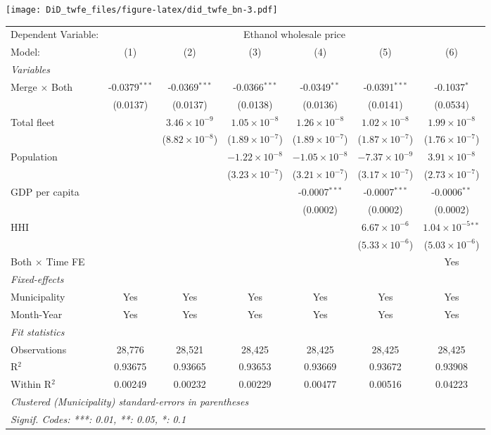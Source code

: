 \documentclass[
]{article}
\begin{document}
\texttt{[image: DiD\_twfe\_files/figure-latex/did\_twfe\_bn-3.pdf]}

\begin{tabular}{lcccccc}
\tabularnewline\midrule\midrule
Dependent Variable:&\multicolumn{6}{c}{Ethanol wholesale price}\\
Model:&(1) & (2) & (3) & (4) & (5) & (6)\\
\midrule \emph{Variables}&   &   &   &   &   &  \\
Merge $\times $ Both & -0.0379$^{***}$ & -0.0369$^{***}$ & -0.0366$^{***}$ & -0.0349$^{**}$ & -0.0391$^{***}$ & -0.1037$^{*}$\\
  &(0.0137) & (0.0137) & (0.0138) & (0.0136) & (0.0141) & (0.0534)\\
Total fleet &    & $3.46\times 10^{-9}$ & $1.05\times 10^{-8}$ & $1.26\times 10^{-8}$ & $1.02\times 10^{-8}$ & $1.99\times 10^{-8}$\\
  &   & ($8.82\times 10^{-8}$) & ($1.89\times 10^{-7}$) & ($1.89\times 10^{-7}$) & ($1.87\times 10^{-7}$) & ($1.76\times 10^{-7}$)\\
Population &    &    & $-1.22\times 10^{-8}$ & $-1.05\times 10^{-8}$ & $-7.37\times 10^{-9}$ & $3.91\times 10^{-8}$\\
  &   &    & ($3.23\times 10^{-7}$) & ($3.21\times 10^{-7}$) & ($3.17\times 10^{-7}$) & ($2.73\times 10^{-7}$)\\
GDP per capita &    &    &    & -0.0007$^{***}$ & -0.0007$^{***}$ & -0.0006$^{**}$\\
  &   &    &    & (0.0002) & (0.0002) & (0.0002)\\
HHI &    &    &    &    & $6.67\times 10^{-6}$ & $1.04\times 10^{-5}$$^{**}$\\
  &   &    &    &    & ($5.33\times 10^{-6}$) & ($5.03\times 10^{-6}$)\\
Both $\times$ Time FE &  &  &  &  &  & Yes\\
\midrule \emph{Fixed-effects}&   &   &   &   &   &  \\
Municipality & Yes & Yes & Yes & Yes & Yes & Yes\\
Month-Year & Yes & Yes & Yes & Yes & Yes & Yes\\
\midrule \emph{Fit statistics}&  & & & & & \\
Observations & 28,776&28,521&28,425&28,425&28,425&28,425\\
R$^2$ & 0.93675&0.93665&0.93653&0.93669&0.93672&0.93908\\
Within R$^2$ & 0.00249&0.00232&0.00229&0.00477&0.00516&0.04223\\
\midrule\midrule\multicolumn{7}{l}{\emph{Clustered (Municipality) standard-errors in parentheses}}\\
\multicolumn{7}{l}{\emph{Signif. Codes: ***: 0.01, **: 0.05, *: 0.1}}\\
\end{tabular}
\end{document}
